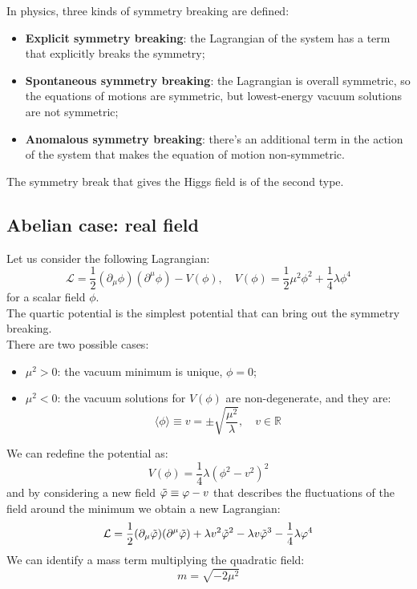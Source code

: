 In physics, three kinds of symmetry breaking are defined:

\begin{itemize}
    \item \textbf{Explicit symmetry breaking}: the Lagrangian of the system has a term that explicitly breaks the symmetry;
    \item \textbf{Spontaneous symmetry breaking}: the Lagrangian is overall symmetric, so the equations of motions are symmetric, but lowest-energy vacuum solutions are not symmetric;
    \item \textbf{Anomalous symmetry breaking}: there's an additional term in the action of the system that makes the equation of motion non-symmetric.
\end{itemize}

The symmetry break that gives the Higgs field is of the second type.

\subsection{Abelian case: real field}
Let us consider the following Lagrangian:
\begin{equation}
    \mathcal{L} = \frac{1}{2} (\partial_{\mu}\phi)(\partial^{\mu}\phi) - V(\phi),  \quad V(\phi) = \frac{1}{2}\mu^2\phi^2 + \frac{1}{4}\lambda\phi^4
\end{equation}
for a scalar field $\phi$. \\


The quartic potential is the simplest potential that can bring out the symmetry breaking.\\
There are two possible cases:
\begin{itemize}
    \item $\mu^2>0$: the vacuum minimum is unique, $\phi = 0$;
    \item $\mu^2<0$: the vacuum solutions for $V(\phi)$ are non-degenerate, and they are:
\begin{equation}
   \langle\phi\rangle \equiv v = \pm \sqrt{\frac{\mu^2}{\lambda}}, \quad v \in \mathbb{R} \label{v_relation}
\end{equation}
\end{itemize}

We can redefine the potential as:
\begin{equation}
    V(\phi) = \frac{1}{4}\lambda(\phi^2- v^2)^2
\end{equation}
and by considering a new field $\Tilde{\phi} \equiv \phi - v$ that describes the fluctuations of the field around the minimum we obtain a new Lagrangian:
\begin{equation}
    \mathcal{L} = \frac{1}{2} (\partial_{\mu}\Tilde{\phi})(\partial^{\mu}\Tilde{\phi}) +\lambda v^2\Tilde{\phi}^2 - \lambda v \Tilde{\phi}^3 - \frac{1}{4}\lambda\phi^4
\end{equation}
We can identify a mass term multiplying the quadratic field:
\begin{equation}
    m = \sqrt{-2 \mu^2}
\end{equation}
